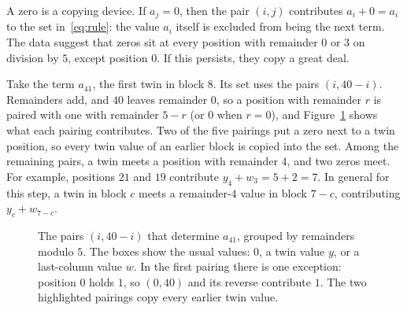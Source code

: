 \documentclass[11pt]{amsart}
\theoremstyle{remark}
\begin{document}
A zero is a copying device. If $a_j=0$, then the pair $(i,j)$ contributes $a_i+0=a_i$ to the set in~\eqref{eq:rule}: the value $a_i$ itself is excluded from being the next term. The data suggest that zeros sit at every position with remainder $0$ or $3$ on division by $5$, except position $0$. If this persists, they copy a great deal.

Take the term $a_{41}$, the first twin in block $8$. Its set uses the pairs $(i,40-i)$. Remainders add, and $40$ leaves remainder $0$, so a position with remainder $r$ is paired with one with remainder $5-r$ (or $0$ when $r=0$), and Figure~\ref{fig:pairs} shows what each pairing contributes. Two of the five pairings put a zero next to a twin position, so every twin value of an earlier block is copied into the set. Among the remaining pairs, a twin meets a position with remainder $4$, and two zeros meet. For example, positions $21$ and $19$ contribute $y_4+w_3=5+2=7$. In general for this step, a twin in block $c$ meets a remainder-$4$ value in block $7-c$, contributing $y_c+w_{7-c}$.

\begin{figure}[H]
\centering
{}
\caption{The pairs $(i,40-i)$ that determine $a_{41}$, grouped by remainders modulo $5$. The boxes show the usual values: $0$, a twin value $y$, or a last-column value $w$. In the first pairing there is one exception: position $0$ holds $1$, so $(0,40)$ and its reverse contribute $1$. The two highlighted pairings copy every earlier twin value.}
\label{fig:pairs}
\end{figure}
\end{document}
